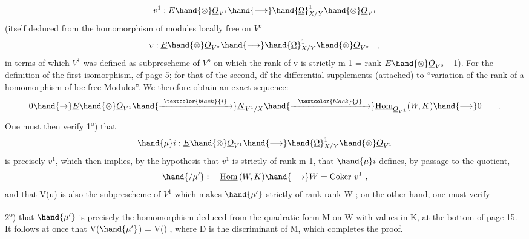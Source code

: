 
\[ v^1 : E\hand{\otimes}\underline{O}_{V^1} \hand{\longrightarrow} \hand{\underline{\Omega}}^1_{X/Y}\hand{\otimes}\underline{O}_{V^1} \]
 (itself deduced from the homomorphism of modules
locally free on $V^o$
\[ v : \underline{E}\hand{\otimes}\underline{O}_{V^o} \hand{\longrightarrow} \hand{\underline{\Omega}}^1_{X/Y}\hand{\otimes} \underline{O}_{V^o} \quad , \]
in terms of which $V^1$ was defined as  subprescheme of $V^o$ on which
the rank of v is strictly \hand{$\leqslant$} m-1 = rank $E\hand{\otimes}\underline{O}_{V^o}$ - 1). For the definition
of the first isomorphism, cf page 5; for that of the second, df the differential
supplements (attached) to ``variation of the rank of a homomorphism of
loc free Modules''. We therefore obtain an exact sequence:
\[ 0 \hand{\to} \underline{E}\hand{\otimes}\underline{O}_{V^1} \hand{\xrightarrow{\ \textcolor{black}{i}\ }} \underline{N}_{V^1/X} \hand{\xrightarrow{\ \ \textcolor{black}{j}\ \ }} \underline{\mathrm{Hom}}_{\underline{O}_{V^1}}(W,K) \hand{\longrightarrow} 0 \qquad . \]
One must then verify 
1\textsuperscript{o}) that
\[ \hand{\mu}i : \underline{E}\hand{\otimes}\underline{O}_{V^1} \hand{\longrightarrow} \hand{\underline{\Omega}}^1_{X/Y}\hand{\otimes}\underline{O}_{V^1} \]
is precisely $v^1$, which then implies, by the hypothesis that
$v^1$ is strictly of rank m-1, that  $\hand{\mu}i$ defines, by passage to the
quotient,
\[ \hand{/\mu'} : \quad \underline{\mathrm{Hom}}\,(W,K) \hand{\longrightarrow} W = \mathrm{Coker}\ v^1 \ , \]
and that V(u) is also the subprescheme of $V^1$ which makes $\hand{\mu'}$ strictly
of rank \hand{\unsure{$<|\leqslant$}}rank W ; on the other hand, one  must
verify

2\textsuperscript{o}) that $\hand{\mu'}$ is precisely the homomorphism deduced from the quadratic
form  M on W with values in K, at the bottom of page 15. It follows
at once that V($\hand{\mu'}$) = V() , where D is the discriminant of M, which
completes the proof.

